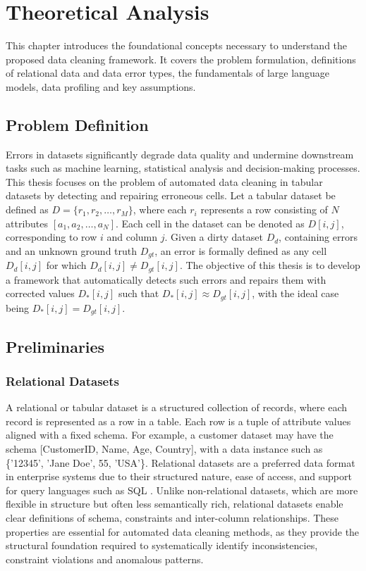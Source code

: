 \chapter{Theoretical Analysis}
This chapter introduces the foundational concepts necessary to understand the proposed data cleaning framework. 
It covers the problem formulation, definitions of relational data and data error types, the fundamentals of large language models, data profiling and key assumptions.
\section{Problem Definition}
Errors in datasets significantly degrade data quality and undermine downstream tasks such as machine learning, statistical analysis and decision-making processes. 
This thesis focuses on the problem of automated data cleaning in tabular datasets by detecting and repairing erroneous cells.\newline
\indent Let a tabular dataset be defined as \( D = \{r_1, r_2, \dots, r_M\} \), where each \( r_i \) represents a row consisting of \( N \) attributes \( [a_1, a_2, \dots, a_N] \). 
Each cell in the dataset can be denoted as \( D[i,j] \), corresponding to row \( i \) and column \( j \).\newline
\indent Given a dirty dataset \( D_{d} \), containing errors and an unknown ground truth \( D_{gt} \), an error is formally defined as any cell \( D_{d}[i,j] \) for which \( D_{d}[i,j] \ne D_{gt}[i,j] \).
The objective of this thesis is to develop a framework that automatically detects such errors and repairs them with corrected values \( D_{*}[i,j] \) such that \( D_{*}[i,j] \approx D_{gt}[i,j] \), with the ideal case being \( D_{*}[i,j] = D_{gt}[i,j] \).
\section{Preliminaries}
\subsection{Relational Datasets}
A relational or tabular dataset is a structured collection of records, where each record is represented as a row in a table. 
Each row is a tuple of attribute values aligned with a fixed schema. 
For example, a customer dataset may have the schema [CustomerID, Name, Age, Country], with a data instance such as \{'12345', 'Jane Doe', 55, 'USA'\}.
Relational datasets are a preferred data format in enterprise systems due to their structured nature, ease of access, and support for query languages such as SQL \cite{SCRD}. 
Unlike non-relational datasets, which are more flexible in structure but often less semantically rich, relational datasets enable clear definitions of schema, constraints and inter-column relationships. 
These properties are essential for automated data cleaning methods, as they provide the structural foundation required to systematically identify inconsistencies, constraint violations and anomalous patterns.

